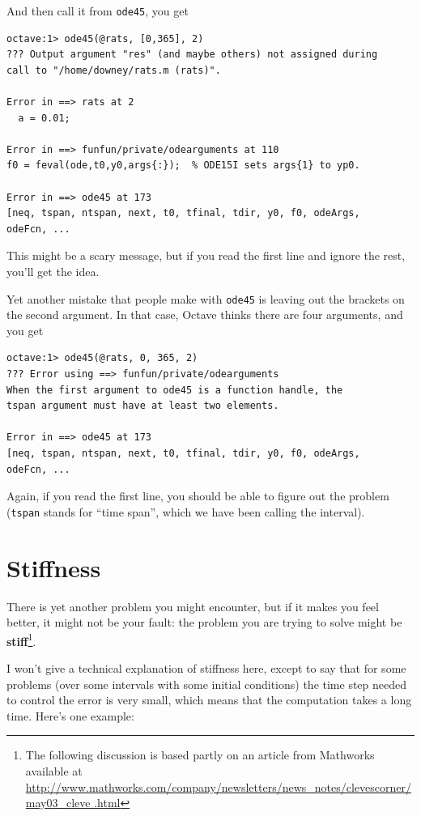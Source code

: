 And then call it from {\tt ode45}, you get

\begin{verbatim}
octave:1> ode45(@rats, [0,365], 2)
??? Output argument "res" (and maybe others) not assigned during 
call to "/home/downey/rats.m (rats)".

Error in ==> rats at 2
  a = 0.01;

Error in ==> funfun/private/odearguments at 110
f0 = feval(ode,t0,y0,args{:});  % ODE15I sets args{1} to yp0.

Error in ==> ode45 at 173
[neq, tspan, ntspan, next, t0, tfinal, tdir, y0, f0, odeArgs, 
odeFcn, ...
\end{verbatim}

This might be a scary message, but if you read the first line
and ignore the rest, you'll get the idea.

Yet another mistake that people make with {\tt ode45} is leaving
out the brackets on the second argument. In that case, Octave
thinks there are four arguments, and you get

\begin{verbatim}
octave:1> ode45(@rats, 0, 365, 2)
??? Error using ==> funfun/private/odearguments
When the first argument to ode45 is a function handle, the 
tspan argument must have at least two elements.

Error in ==> ode45 at 173
[neq, tspan, ntspan, next, t0, tfinal, tdir, y0, f0, odeArgs, 
odeFcn, ...
\end{verbatim}

Again, if you read the first line, you should be able to figure
out the problem ({\tt tspan} stands for ``time span'', which we
have been calling the interval).


\section{Stiffness}

There is yet another problem you might encounter, but if it makes you
feel better, it might not be your fault: the problem you are trying to
solve might be {\bf stiff}\footnote{The following discussion is based
partly on an article from Mathworks available at
\url{
http://www.mathworks.com/company/newsletters/news_notes/clevescorner/may03_cleve
.html}}.

I won't give a technical explanation of stiffness here, except
to say that for some problems (over some intervals with some initial
conditions) the time step needed to control the error is very small,
which means that the computation takes a long time. Here's one
example:

